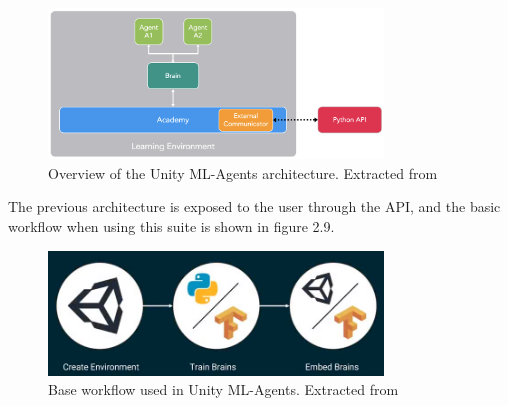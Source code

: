     \begin{figure}[!ht]
        \centering
        \includegraphics[width=3.5in]{./chapters/imgs/img_unity_mlagents_api_overview.png}
        \caption[unity ml agents overview]{Overview of the Unity ML-Agents architecture. Extracted from \citet{unity-ml-agents}}
        \label{fig:unity-ml-agents-overview}
    \end{figure}

    The previous architecture is exposed to the user through the API, and the basic workflow when using
    this suite is shown in figure 2.9.

    \begin{figure}[!ht]
        \centering
        \includegraphics[width=3.5in]{./chapters/imgs/img_unity_mlagents_workflow.png}
        \caption[unity ml agents workflow]{Base workflow used in Unity ML-Agents. Extracted from \citet{unity-ml-agents}}
        \label{fig:unity-ml-agents-workflow}
    \end{figure}